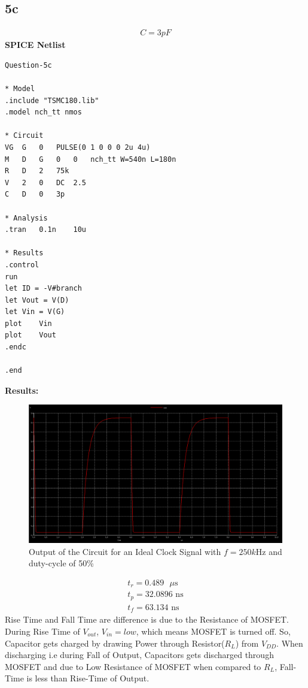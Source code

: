 \documentclass{article}
\begin{document}
\subsection{5c}
\begin{align}
    C = 3pF
\end{align}
\textbf{SPICE Netlist}
\begin{lstlisting}
Question-5c

* Model
.include "TSMC180.lib"
.model nch_tt nmos

* Circuit
VG	G	0	PULSE(0 1 0 0 0 2u 4u)
M	D	G	0	0	nch_tt W=540n L=180n
R	D	2	75k
V	2	0	DC	2.5
C	D	0	3p

* Analysis
.tran	0.1n	10u

* Results
.control
run 
let ID = -V#branch
let Vout = V(D)
let Vin = V(G)
plot	Vin
plot	Vout
.endc

.end
\end{lstlisting}
\textbf{Results:}
\begin{figure}[!ht]
    \centering
    \includegraphics[scale=0.25]{Images/5coutput.png}
    \caption{Output of the Circuit for an Ideal Clock Signal with $f=250k\text{Hz}$ and duty-cycle of 50\%}
\end{figure}
\begin{align}
    t_r = 0.489 \text{ $\mu$s}\\
    t_p = 32.0896 \text{ ns}\\
    t_f = 63.134 \text{ ns}
\end{align}
Rise Time and Fall Time are difference is due to the Resistance of MOSFET. During Rise Time of $V_{out}$, $V_{in} = low$, which means MOSFET is turned off. So, Capacitor gets charged by drawing Power through Resistor($R_L$) from $V_{DD}$. When discharging i.e during Fall of Output, Capacitors gets discharged through MOSFET and due to Low Resistance of MOSFET when compared to $R_{L}$, Fall-Time is less than Rise-Time of Output.
\end{document}
